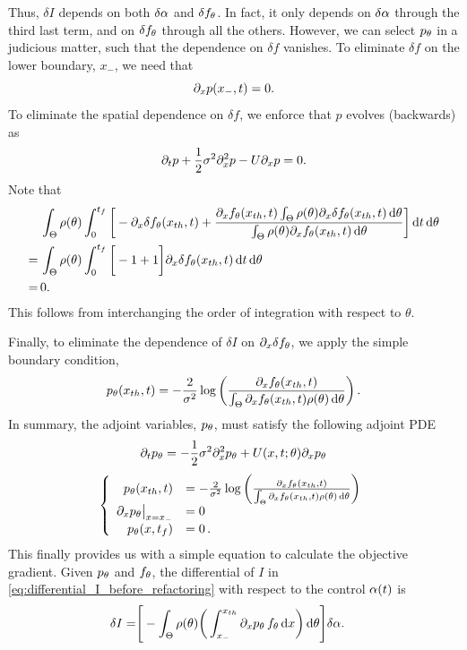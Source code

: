 \documentclass[12pt]{article}
\def \tf {{t_f}}
\begin{document}
Thus, $\delta I$ depends on both $\delta {\alpha}$ and $\delta f_{\theta}$. 
In fact, it only depends on $\delta {\alpha}$ through the third last term, and on
$\delta f_{\theta}$ through all the others.
However, we can select $p_{\theta}$ in a judicious matter, such that the
dependence on $\delta f$ vanishes. To eliminate $\delta f$ on the lower boundary,
$x_-$, we need that $$ {\partial}_xp(x_-,t)=0.$$
To eliminate the spatial dependence on $\delta f$, we 
enforce that $p$ evolves (backwards) as $${\partial}_t p + \frac{1
}{2}{\sigma }^2{\partial}_x^2p - U {\partial}_x p = 0.$$
Note that
\begin{align*}
&\, \int_\Theta  \rho(\th) \int_0^{\tf} \bigg[ 
-  \di_x
		\delta f_\th(\xth, t)
+    \frac{ \di_x f_\th(\xth, t) \int_\Theta \rho(\th) \di_x \delta f_\th(\xth, t) 	\intd{\th}}{	{\int_\Theta \rho(\th)\di_xf_\th(\xth,
	t)\intd{\th} }} 
		 	 \bigg] \intd{t}	\intd{\th}	   
 \\
 =& \, 
 \int_\Theta  \rho(\th) \int_0^{\tf}  
\bigg[ - 1 +  1 \bigg]   \di_x \delta f_\th(\xth, t)	\intd{t}
                 \intd{\th}	\\
=& \, 0.		 
\end{align*}
This follows from interchanging the order of integration with respect to
$\theta$.

Finally, to eliminate the dependence of  $\delta
I$ on ${\partial}_x \delta f_{\theta}$, we apply the simple boundary
condition, 
$$ p_{\theta}({ x_{th} },t) = - \frac{2}{{\sigma }^2} \log\left( \frac{{\partial}_xf_{\theta}({ x_{th} }, t)}
						{\int_\Theta {\partial}_xf_{\theta}({ x_{th} }, t)\rho({\theta})\, \mathrm{d} {\theta} } \right) .$$
In summary, the adjoint variables, $p_{\theta}$, must satisfy the following adjoint
PDE
\begin{equation*}
{\partial}_t p_{\theta} =   -\frac{1 }{2}{\sigma }^2 {\partial}^2_x p_{\theta} +U(x,t;{\theta})   {\partial}_x p_{\theta} \nonumber
\end{equation*}
\begin{equation}
\left \{ \begin{array}{rl}
p_\th (\xth,t) &=  - \frac{2}{\s^2}\log\left( 
\frac{\di_xf_\th(\xth, t)}{\int_\Theta \di_xf_\th(\xth, t)\rho(\th)\intd{\th} } \right) \\
\di_x p_\th  \big |_{x=\xmin} &= 0\\
p_\th(x,\tf) &= 0\,.\\
\end{array} \right .
\label{eq:adjoint_pde_OU}
\end{equation}
This finally provides us with a simple equation to calculate the
objective gradient. 
Given $p_{\theta}$ and $f_{\theta}$, the differential of $I$ in
\cref{eq:differential_I_before_refactoring} with respect to the
control ${\alpha}(t)$ is 
\begin{align}
\delta I =&  \Bigg[
-\int_\Theta  \rho({\theta})  \bigg(  
 \int_{ x_{-} }^{{ x_{th} }} {\partial}_x p_{\theta} \, f_{\theta} \, \mathrm{d} x 
    \bigg) \, \mathrm{d} {\theta} \Bigg] \delta {\alpha}.
    \label{eq:objective_gradient_continuous}
\end{align}
\end{document}
